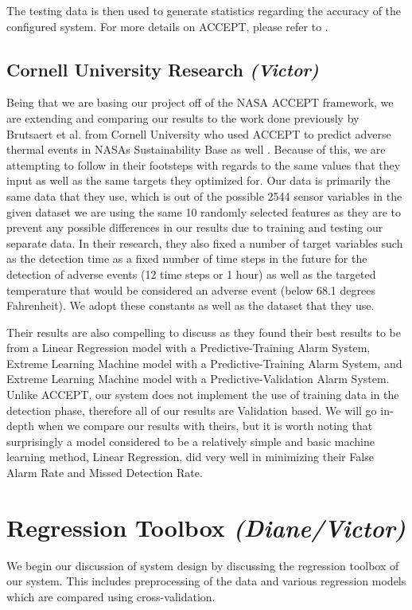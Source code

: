 \documentclass{acm_proc_article-sp}
\begin{document}
The testing data is then used to generate statistics regarding the accuracy of the configured system. For more details on ACCEPT, please refer to \cite{accept}.


\subsection{Cornell University Research \textit{(Victor)}}
Being that we are basing our project off of the NASA ACCEPT framework, we are extending and comparing our results to the work done previously by Brutsaert et al. from Cornell University who used ACCEPT to predict adverse thermal events in NASAs Sustainability Base as well \cite{Cornell}. Because of this, we are attempting to follow in their footsteps with regards to the same values that they input as well as the same targets they optimized for. Our data is primarily the same data that they use, which is out of the possible 2544 sensor variables in the given dataset we are using the same 10 randomly selected features as they are to prevent any possible differences in our results due to training and testing our separate data. In their research, they also fixed a number of target variables such as the detection time as a fixed number of time steps in the future for the detection of adverse events (12 time steps or 1 hour) as well as the targeted temperature that would be considered an adverse event (below 68.1 degrees Fahrenheit). We adopt these constants as well as the dataset that they use.

Their results are also compelling to discuss as they found their best results to be from a Linear Regression model with a Predictive-Training Alarm System, Extreme Learning Machine model with a Predictive-Training Alarm System, and Extreme Learning Machine model with a Predictive-Validation Alarm System. Unlike ACCEPT, our system does not implement the use of training data in the detection phase, therefore all of our results are Validation based. We will go in-depth when we compare our results with theirs, but it is worth noting that surprisingly a model considered to be a relatively simple and basic machine learning method, Linear Regression, did very well in minimizing their False Alarm Rate and Missed Detection Rate.

\section{Regression Toolbox \textit{(Diane/Victor)}}
We begin our discussion of system design by discussing the regression toolbox of our system. This includes preprocessing of the data and various regression models which are compared using cross-validation.
\end{document}

